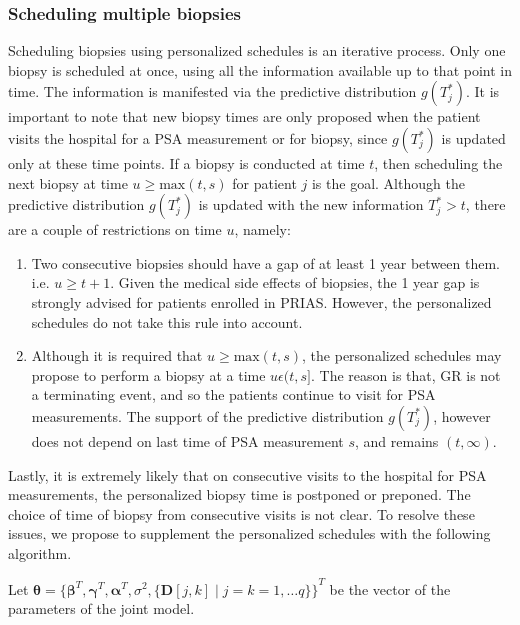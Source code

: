 \subsubsection{Scheduling multiple biopsies}
\label{subsubsec : pers_sched_algorithm}
Scheduling biopsies using personalized schedules is an iterative process. Only one biopsy is scheduled at once, using all the information available up to that point in time. The information is manifested via the predictive distribution $g(T^*_j)$. It is important to note that new biopsy times are only proposed when the patient visits the hospital for a PSA measurement or for biopsy, since $g(T^*_j)$ is updated only at these time points. If a biopsy is conducted at time $t$, then scheduling the next biopsy at time $u \geq \text{max}(t,s)$ for patient $j$ is the goal. Although the predictive distribution $g(T^*_j)$ is updated with the new information $T^*_j > t$, there are a couple of restrictions on time $u$, namely:

\begin{enumerate}
\item Two consecutive biopsies should have a gap of at least 1 year between them. i.e. $u \geq t + 1$. Given the medical side effects of biopsies, the 1 year gap is strongly advised for patients enrolled in PRIAS. However, the personalized schedules do not take this rule into account.
\item Although it is required that $u \geq \text{max}(t,s)$, the personalized schedules may propose to perform a biopsy at a time $u \epsilon (t, s]$. The reason is that, GR is not a terminating event, and so the patients continue to visit for PSA measurements. The support of the predictive distribution $g(T^*_j)$, however does not depend on last time of PSA measurement $s$, and remains $(t, \infty)$.
\end{enumerate}
 
Lastly, it is extremely likely that on consecutive visits to the hospital for PSA measurements, the personalized biopsy time is postponed or preponed. The choice of time of biopsy from consecutive visits is not clear. To resolve these issues, we propose to supplement the personalized schedules with the following algorithm.


Let $\boldsymbol{\theta} = {\{\boldsymbol{\beta}^T, \boldsymbol{\gamma}^T, \boldsymbol{\alpha}^T, \sigma^2, \{\boldsymbol{D}[j,k] \mid j=k=1, \ldots q\}\}}^T$ be the vector of the parameters of the joint model.


